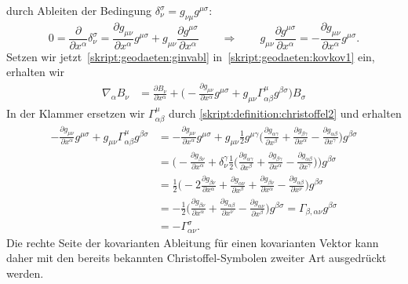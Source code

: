 durch Ableiten der Bedingung $\delta_\nu^\sigma=g_{\nu\mu}g^{\mu\sigma}$:
\begin{equation}
0
=
\frac{\partial}{\partial x^\alpha}\delta_\nu^\sigma
=
\frac{\partial g_{\mu\nu}}{\partial x^\alpha} g^{\mu\sigma}
+
g_{\mu\nu}
\frac{\partial g^{\mu\sigma}}{\partial x^\alpha}
\qquad\Rightarrow\qquad
g_{\mu\nu}
\frac{\partial g^{\mu\sigma}}{\partial x^\alpha}
=
-
\frac{\partial g_{\mu\nu}}{\partial x^\alpha} g^{\mu\sigma}.
\label{skript:geodaeten:ginvabl}
\end{equation}
Setzen wir jetzt~\eqref{skript:geodaeten:ginvabl}
in~\eqref{skript:geodaeten:kovkov1} ein, erhalten wir
\begin{align*}
\nabla_\alpha B_\nu
&=
\frac{\partial B_\nu}{\partial x^\alpha}
+
\biggl(
-\frac{\partial g_{\mu\nu}}{\partial x^\alpha} g^{\mu\sigma}
+
g_{\mu\nu}
\Gamma^\mu_{\alpha\beta}g^{\beta\sigma}
\biggr)B_\sigma
\end{align*}
In der Klammer ersetzen wir $\Gamma^\mu_{\alpha\beta}$ durch
\eqref{skript:definition:christoffel2} und erhalten
\begin{align*}
-\frac{\partial g_{\mu\nu}}{\partial x^\alpha} g^{\mu\sigma}
+
g_{\mu\nu}
\Gamma^\mu_{\alpha\beta}
g^{\beta\sigma}
&=
-\frac{\partial g_{\mu\nu}}{\partial x^\alpha} g^{\mu\sigma}
+
g_{\mu\nu}
\frac12
g^{\mu\gamma}
\biggl(
\frac{\partial g_{\alpha\gamma}}{\partial x^\beta}
+
\frac{\partial g_{\beta\gamma}}{\partial x^\alpha}
-
\frac{\partial g_{\alpha\beta}}{\partial x^\gamma}
\biggr)
g^{\beta\sigma}
\\
&=
\biggl(
-\frac{\partial g_{\beta\nu}}{\partial x^\alpha}
+
\delta_\nu^\gamma
\frac12
\biggl(
\frac{\partial g_{\alpha\gamma}}{\partial x^\beta}
+
\frac{\partial g_{\beta\gamma}}{\partial x^\alpha}
-
\frac{\partial g_{\alpha\beta}}{\partial x^\gamma}
\biggr)
\biggr)
g^{\beta\sigma}
\\
&=
\frac12
\biggl(
-2\frac{\partial g_{\beta\nu}}{\partial x^\alpha}
+
\frac{\partial g_{\alpha\nu}}{\partial x^\beta}
+
\frac{\partial g_{\beta\nu}}{\partial x^\alpha}
-
\frac{\partial g_{\alpha\beta}}{\partial x^\nu}
\biggr)
g^{\beta\sigma}
\\
&=
-\frac12
\biggl(
\frac{\partial g_{\beta\nu}}{\partial x^\alpha}
+
\frac{\partial g_{\alpha\beta}}{\partial x^\nu}
-
\frac{\partial g_{\alpha\nu}}{\partial x^\beta}
\biggr)
g^{\beta\sigma}
=
\Gamma_{\beta,\alpha\nu}g^{\beta\sigma}
\\
&=-\Gamma^\sigma_{\alpha\nu}.
\end{align*}
Die rechte Seite der kovarianten Ableitung für einen kovarianten Vektor
kann daher mit den bereits bekannten Christoffel-Symbolen zweiter Art
ausgedrückt werden.

